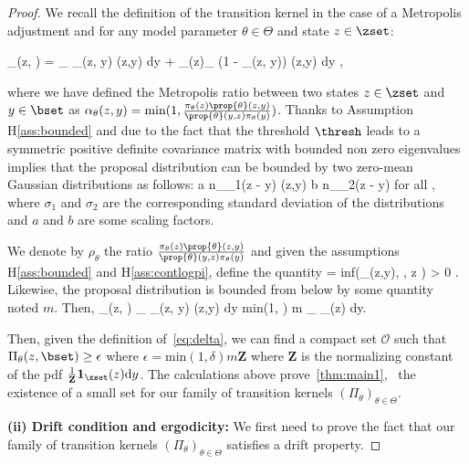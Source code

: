 \documentclass[letterpaper]{article} %
\begin{document}
\begin{proof}
We recall the definition of the transition kernel in the case of a Metropolis adjustment and for any model parameter $\theta \in \Theta$ and state $z \in \zset$:

\beq 
\Pi_\theta(z, \bset) = \int_{\bset} \alpha_\theta(z, y) \prop{\theta}(z,y) \textrm{d}y + _{\bset(z)}\int_{\zset} (1 - \alpha_\theta(z, y)) \prop{\theta}(z,y) \textrm{d}y \eqsp,
\eeq

where we have defined the Metropolis ratio between two states $z \in \zset$ and $y \in \bset$ as $\alpha_\theta(z, y) = \textrm{min}(1, \frac{\pi_\theta(z)  \prop{\theta}(z,y)}{\prop{\theta}(y,z) \pi_\theta(y)  })$.
Thanks to Assumption H\ref{ass:bounded} and due to the fact that the threshold $\thresh$ leads to a symmetric positive definite covariance matrix with bounded non zero eigenvalues implies that the proposal distribution can be bounded by two zero-mean Gaussian distributions as follows:
\beq\label{eq:twogauss}
a n_{\sigma_1}(z - y) \leq \prop{\theta}(z,y)  \leq b n_{\sigma_2}(z - y) \quad \textrm{for all} \quad \theta \in \Theta\eqsp,
\eeq
where $\sigma_1$ and $\sigma_2$ are the corresponding standard deviation of the distributions and $a$ and $b$ are some scaling factors.

We denote by $\rho_\theta$ the ratio $\frac{\pi_\theta(z)  \prop{\theta}(z,y)}{\prop{\theta}(y,z) \pi_\theta(y)  }$ and given the assumptions H\ref{ass:bounded} and H\ref{ass:contlogpi}, define the quantity 
\beq\label{eq:delta}
\delta = \textrm{inf}(\rho_\theta(z,y), \theta \in \Theta, \quad z \in {} ) > 0 \eqsp.
\eeq
Likewise, the proposal distribution is bounded from below by some quantity noted $m$.
Then,
\beq
\Pi_\theta(z, \bset) \geq  \int_{\bset \cap \xset} \alpha_\theta(z, y) \prop{\theta}(z,y) \textrm{d}y \geq \textrm{min}(1, \delta) m \int_{\bset} _\xset(z)  \textrm{d}y\eqsp.
\eeq

Then, given the definition of~\eqref{eq:delta}, we can find a compact set $\mathcal{O}$ such that $\Pi_\theta(z, \bset) \geq  \epsilon$ where $\epsilon = \textrm{min}(1, \delta) m \textbf{Z}$ where $\textbf{Z}$ is the normalizing constant of the pdf $\frac{1}{\textbf{Z}}\mathbf{1}_\xset(z)  \textrm{d}y$.
The calculations above prove~\eqref{thm:main1}, \ie\ the existence of a small set for our family of transition kernels $(\Pi_\theta)_{\theta \in \Theta}$.

\medskip
\noindent \textbf{(ii) Drift condition and ergodicity: }
We first need to prove the fact that our family of transition kernels $(\Pi_\theta)_{\theta \in \Theta}$ satisfies a drift property.


\end{proof}
\end{document}
